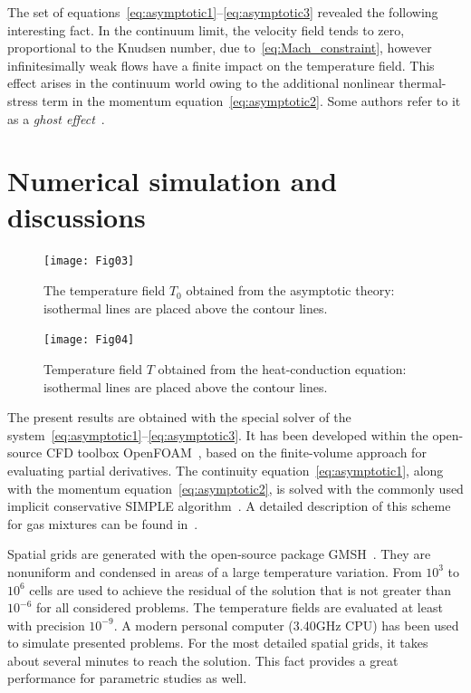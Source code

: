 \documentclass[smallextended, referee]{svjour3} %
\begin{document}
The set of equations~\eqref{eq:asymptotic1}--\eqref{eq:asymptotic3} revealed the following interesting fact.
In the continuum limit, the velocity field tends to zero, proportional to the Knudsen number,
due to~\eqref{eq:Mach_constraint}, however infinitesimally weak flows
have a finite impact on the temperature field.
This effect arises in the continuum world owing to the additional nonlinear thermal-stress term
in the momentum equation~\eqref{eq:asymptotic2}.
Some authors refer to it as a \emph{ghost effect}~\cite{Sone2002, Sone2007}.

\section{Numerical simulation and discussions}

\begin{figure}[ht]
    \centering
    \texttt{[image: Fig03]}
    \caption{The temperature field \(T_0\) obtained from the asymptotic theory:
        isothermal lines are placed above the contour lines.}
    \label{fig:moving:T_asym}
\end{figure}

\begin{figure}[ht]
    \centering
    \texttt{[image: Fig04]}
    \caption{Temperature field \(T\) obtained from the heat-conduction equation:
        isothermal lines are placed above the contour lines.}
    \label{fig:moving:T_heat}
\end{figure}

The present results are obtained with the special solver of the system~\eqref{eq:asymptotic1}--\eqref{eq:asymptotic3}.
It has been developed within the open-source CFD toolbox OpenFOAM\textregistered{}~\cite{OpenFOAM1998},
based on the finite-volume approach for evaluating partial derivatives.
The continuity equation~\eqref{eq:asymptotic1}, along with the momentum equation~\eqref{eq:asymptotic2},
is solved with the commonly used implicit conservative SIMPLE algorithm~\cite{SIMPLE}.
A detailed description of this scheme for gas mixtures can be found in~\cite{Laneryd2007}.

Spatial grids are generated with the open-source package GMSH~\cite{GMSH}.
They are nonuniform and condensed in areas of a large temperature variation.
From \(10^3\) to \(10^6\) cells are used to achieve the residual of the solution
that is not greater than \(10^{-6}\) for all considered problems.
The temperature fields are evaluated at least with precision \(10^{-9}\).
A modern personal computer (3.40GHz CPU) has been used to simulate presented problems.
For the most detailed spatial grids, it takes about several minutes to reach the solution.
This fact provides a great performance for parametric studies as well.
\end{document}
